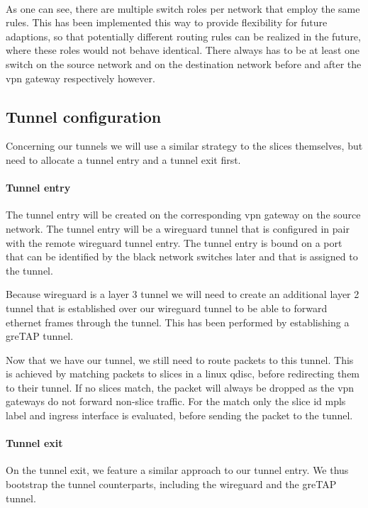 \paragraph{} As one can see, there are multiple switch roles per network that employ the same rules. This has been implemented this way to provide flexibility for future adaptions, so that potentially different routing rules can be realized in the future, where these roles would not behave identical. There always has to be at least one switch on the source network and on the destination network before and after the \acrshort{vpn} gateway respectively however.

\subsection{Tunnel configuration}
\label{impl_tunnel_config}
Concerning our tunnels we will use a similar strategy to the slices themselves, but need to allocate a tunnel entry and a tunnel exit first.

\paragraph{Tunnel entry} The tunnel entry will be created on the corresponding \acrshort{vpn} gateway on the source network. The tunnel entry will be a wireguard tunnel that is configured in pair with the remote wireguard tunnel entry. The tunnel entry is bound on a port that can be identified by the black network switches later and that is assigned to the tunnel.

Because wireguard is a layer 3 tunnel we will need to create an additional layer 2 tunnel that is established over our wireguard tunnel to be able to forward ethernet frames through the tunnel. This has been performed by establishing a \acrshort{gre}TAP tunnel.

Now that we have our tunnel, we still need to route packets to this tunnel. This is achieved by matching packets to slices in a linux qdisc, before redirecting them to their tunnel. If no slices match, the packet will always be dropped as the \acrshort{vpn} gateways do not forward non-slice traffic. For the match only the slice id \acrshort{mpls} label and ingress interface is evaluated, before sending the packet to the tunnel.

\paragraph{Tunnel exit} On the tunnel exit, we feature a similar approach to our tunnel entry. We thus bootstrap the tunnel counterparts, including the wireguard and the \acrshort{gre}TAP tunnel.

